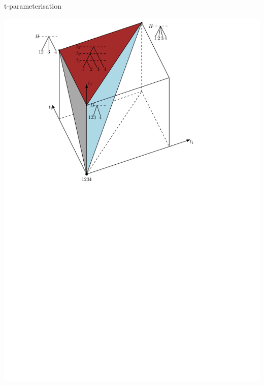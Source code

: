 \documentclass{beamer}
\renewcommand{\t}{$\mathrm{t}$}
\begin{document}
\begin{frame}{\t-parameterisation}
\begin{definition}
\begin{center}
\includegraphics[width=0.65\framewidth]{simplex}
\end{center}
\end{definition}
\end{frame}
\end{document}
